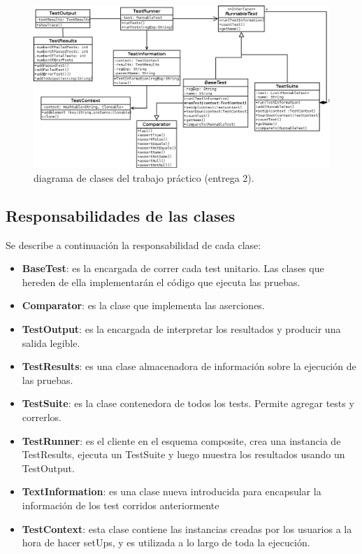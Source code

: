 \documentclass[12pt]{article}
\begin{document}
\begin{figure}[h!]
\begin{center}
	\includegraphics[scale=0.50,angle=90]{./ClassDiagram2}
\end{center}
	\caption{diagrama de clases del trabajo práctico (entrega 2).}
\end{figure}

\subsection{Responsabilidades de las clases}
Se describe a continuación la responsabilidad de cada clase:
\begin{itemize}
	\item \textbf{BaseTest}: es la encargada de correr cada test unitario.
		Las clases que hereden de ella implementarán el código que 
		ejecuta las pruebas. 
		
	\item \textbf{Comparator}: es la clase que implementa las aserciones.	
	
	\item \textbf{TestOutput}: es la encargada de interpretar los resultados
		y producir una salida legible.		
			
	\item \textbf{TestResults}: es una clase almacenadora de información
		sobre la ejecución de las pruebas.
	
	\item \textbf{TestSuite}: es la clase contenedora de todos los tests.
		Permite agregar tests y correrlos.
		
	\item \textbf{TestRunner}: es el cliente en el esquema composite, crea
		una instancia de TestResults, ejecuta un TestSuite y luego
		muestra los resultados usando un TestOutput.	
		
	\item \textbf{TextInformation}: es una clase nueva introducida para 
		encapsular la información de los test corridos anteriormente
	
	\item \textbf{TestContext}: esta clase contiene las instancias creadas
		por los usuarios a la hora de hacer setUps, y es utilizada
		a lo largo de toda la ejecución.

\end{itemize}
\end{document}
